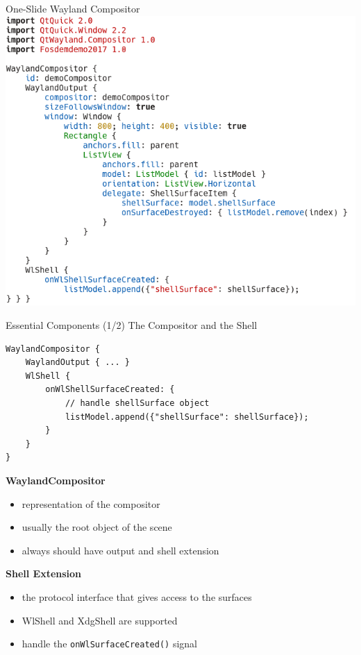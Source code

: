 \documentclass[ucs,9pt]{beamer}
\begin{document}
\begin{frame}
    {One-Slide Wayland Compositor}
    \vspace{-1em}
    \includegraphics[height=.8\paperheight]{OneSlideCompositor.png}
\end{frame}

\begin{frame}[fragile]
    {Essential Components (1/2)}
    {The Compositor and the Shell}

    \vspace{-1em}
    \begin{lstlisting}
WaylandCompositor {
    WaylandOutput { ... }
    WlShell {
        onWlShellSurfaceCreated: {
            // handle shellSurface object
            listModel.append({"shellSurface": shellSurface});
        }
    }
}
    \end{lstlisting}
    \vspace{-1em}

    \textbf{WaylandCompositor}
    \begin{itemize}
        \item representation of the compositor
        \item usually the root object of the scene
        \item always should have output and shell extension
    \end{itemize}
    \smallskip

    \textbf{Shell Extension}
    \begin{itemize}
        \item the protocol interface that gives access to the surfaces
        \item WlShell and XdgShell are supported
        \item handle the \texttt{onWlSurfaceCreated()} signal
    \end{itemize}
\end{frame}
\end{document}
